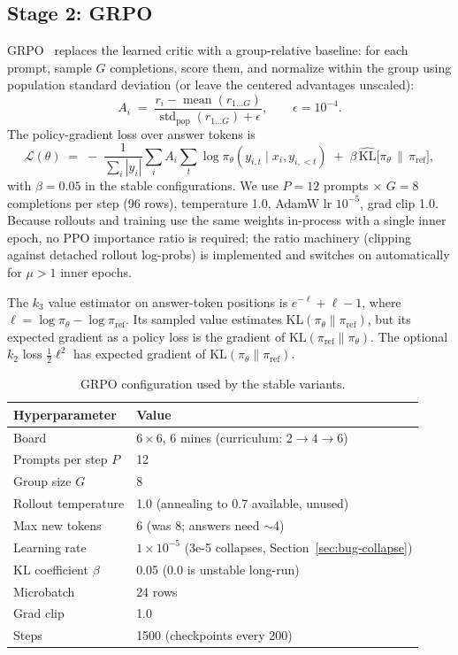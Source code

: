 \documentclass[11pt]{article}
\begin{document}
\subsection{Stage 2: GRPO}
GRPO~\cite{shao2024deepseekmath} replaces the learned critic with a
group-relative baseline: for each prompt, sample $G$ completions, score them,
and normalize within the group using population standard deviation (or leave
the centered advantages unscaled):
\begin{equation}
A_{i} \;=\; \frac{r_i - \operatorname{mean}(r_{1\ldots G})}
                 {\operatorname{std}_{\mathrm{pop}}(r_{1\ldots G}) + \epsilon},
\qquad \epsilon = 10^{-4}.
\label{eq:grpo}
\end{equation}
The policy-gradient loss over answer tokens is
\begin{equation}
\mathcal{L}(\theta) \;=\; -\;\frac{1}{\sum_i |y_i|}
\sum_{i} A_i \sum_{t} \log \pi_\theta(y_{i,t} \mid x_i, y_{i,<t})
\;+\; \beta\, \widehat{\mathrm{KL}}\big[\pi_\theta \,\|\, \pi_{\mathrm{ref}}\big],
\end{equation}
with $\beta = 0.05$ in the stable configurations. We use $P = 12$ prompts
$\times$ $G = 8$ completions per step (96 rows), temperature 1.0, AdamW lr
$10^{-5}$, grad clip 1.0. Because rollouts and training use the same weights
in-process with a single inner epoch, no PPO importance ratio is required;
the ratio machinery (clipping against detached rollout log-probs) is
implemented and switches on automatically for $\mu > 1$ inner epochs.

The $k_3$ value estimator on answer-token positions is
$e^{-\ell}+\ell-1$, where $\ell=\log\pi_\theta-\log\pi_{\mathrm{ref}}$.
Its sampled value estimates $\mathrm{KL}(\pi_\theta\|\pi_{\mathrm{ref}})$,
but its expected gradient as a policy loss is the gradient of
$\mathrm{KL}(\pi_{\mathrm{ref}}\|\pi_\theta)$. The optional $k_2$ loss
$\frac{1}{2}\ell^2$ has expected gradient of
$\mathrm{KL}(\pi_\theta\|\pi_{\mathrm{ref}})$.

\begin{table}[H]
\centering
\small
\begin{tabular}{ll}
\toprule
Hyperparameter & Value \\
\midrule
Board & $6\times6$, 6 mines (curriculum: $2\to4\to6$) \\
Prompts per step $P$ & 12 \\
Group size $G$ & 8 \\
Rollout temperature & 1.0 (annealing to 0.7 available, unused) \\
Max new tokens & 6 (was 8; answers need $\sim$4) \\
Learning rate & $1{\times}10^{-5}$ (3e-5 collapses, Section~\ref{sec:bug-collapse}) \\
KL coefficient $\beta$ & 0.05 (0.0 is unstable long-run) \\
Microbatch & 24 rows \\
Grad clip & 1.0 \\
Steps & 1500 (checkpoints every 200) \\
\bottomrule
\end{tabular}
\caption{GRPO configuration used by the stable variants.}
\end{table}
\end{document}
